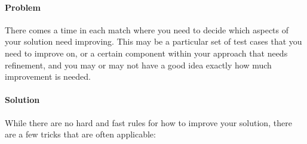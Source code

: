 \documentclass[]{article}
\let\oldparagraph\paragraph
\renewcommand{\paragraph}[1]{\oldparagraph{#1}\mbox{}}
\begin{document}
\hypertarget{problem-4}{%
\paragraph{Problem}\label{problem-4}}

There comes a time in each match where you need to decide which aspects
of your solution need improving. This may be a particular set of test
cases that you need to improve on, or a certain component within your
approach that needs refinement, and you may or may not have a good idea
exactly how much improvement is needed.

\hypertarget{solution-4}{%
\paragraph{Solution}\label{solution-4}}

While there are no hard and fast rules for how to improve your solution,
there are a few tricks that are often applicable:
\end{document}
